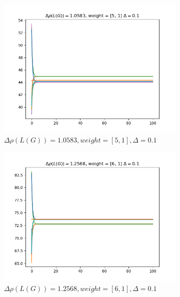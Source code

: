 \documentclass{article}
\begin{document}
\begin{problem}
    \newpage
    \begin{figure}[!h]
        \centering
        \begin{subfigure}{0.4\textwidth}
            \includegraphics[width=\textwidth]{./img/Figure_4.png}
            \caption{$\Delta \rho (L(G)) = 1.0583, weight = [5,1], \Delta = 0.1$}
        \end{subfigure}
        \begin{subfigure}{0.4\textwidth}
            \includegraphics[width=\textwidth]{./img/Figure_5.png}
            \caption{$\Delta \rho (L(G)) = 1.2568, weight = [6,1], \Delta = 0.1$ }
        \end{subfigure}
        \begin{subfigure}{0.4\textwidth}

\end{subfigure}
\end{figure}
\end{problem}
\end{document}
